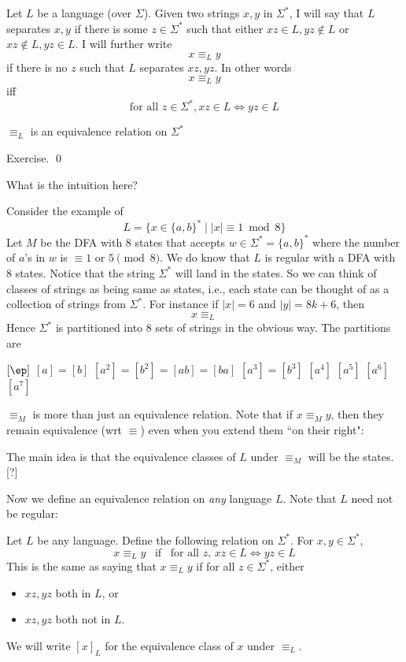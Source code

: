 Let $L$ be a language (over $\Sigma$).
Given two strings $x,y$ in $\Sigma^*$, I will say
that $L$ separates $x,y$ if
there is some $z \in \Sigma^*$ such that 
either
$xz \in L, yz \not\in L$
or 
$xz \not\in L, yz \in L$.
I will further write
\[
x \equiv_L y
\]
if there is no $z$ such that $L$ separates $xz,yz$.
In other words
\[
x \equiv_L y
\]
iff
\[
\text{for all } z \in \Sigma^*, xz \in L \iff yz \in L
\]


\begin{prop}
$\equiv_L$ is an equivalence relation on $\Sigma^*$
\end{prop}
\proof
Exercise.
\qed


What is the intuition here?


Consider the example of
\[
L = \{ x \in \{a,b\}^* \mid |x| \equiv 1 \bmod{8}\}
\]
Let $M$ be the DFA with 8 states that accepts
$w \in \Sigma^* = \{a, b\}^*$ where the number of
$a$'s in $w$ is $\equiv 1$ or $5 \pmod{8}$.
We do know that $L$ is regular with a DFA with 8 states.
Notice that the string $\Sigma^*$ will land in the states.
So we can think of classes of strings as being same as states, i.e.,
each state can be thought of as a collection of strings from $\Sigma^*$.
For instance if $|x| = 6$ and $|y| = 8k + 6$, then
\[
x \equiv_L
\]
Hence $\Sigma^*$ is partitioned into 8 sets of strings in the obvious way.
The partitions are
\begin{tightlist}
  \li $[\ep]$
  \li $[a] = [b]$
  \li $[a^2] = [b^2] = [ab] = [ba]$
  \li $[a^3] = [b^3]$
  \li $[a^4]$
  \li $[a^5]$
  \li $[a^6]$
  \li $[a^7]$
\end{tightlist}

\newpage


$\equiv_M$ is more than just an equivalence relation. Note that if
$x \equiv_M y$, then they remain equivalence (wrt $\equiv$) even
when you extend them ``on their right":




The main idea is that the equivalence classes of $L$ under
$\equiv_M$ will be the states. [?]

Now we define an equivalence relation on \textit{any} language $L$.
Note that $L$ need not be regular:

\begin{defn}
  Let $L$ be any language.
  Define the following relation on $\Sigma^*$.
  For $x,y \in \Sigma^*$, 
  \[
  x \equiv_L y \,\,\, \text{ if } \,\,\,\text{for all $z$, } xz \in L
  \iff yz \in L
  \]  
  This is the same as saying that $x \equiv_L y$ if for all $z \in
  \Sigma^*$, either
  \begin{itemize}
  \item $xz, yz$ both in $L$, or
  \item $xz, yz$ both not in $L$.
  \end{itemize}
  
  We will write $[x]_L$ for the equivalence class of $x$ under
  $\equiv_L$.

\end{defn}



